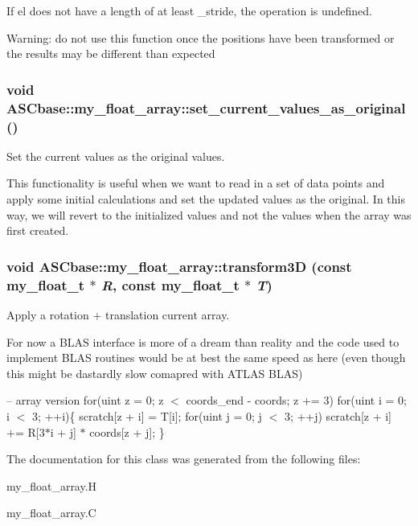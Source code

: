 If el does not have a length of at least \_\-stride, the operation is undefined.

Warning: do not use this function once the positions have been transformed or the results may be different than expected 
\subsubsection{\setlength{\rightskip}{0pt plus 5cm}void ASCbase::my\_\-float\_\-array::set\_\-current\_\-values\_\-as\_\-original ()\hspace{0.3cm}{\tt  [inline]}}\label{classASCbase_1_1my__float__array_a98bd8a8f5970ca4cd7523e15a0af9f8}


Set the current values as the original values. 

This functionality is useful when we want to read in a set of data points and apply some initial calculations and set the updated values as the original. In this way, we will revert to the initialized values and not the values when the array was first created. 
\subsubsection{\setlength{\rightskip}{0pt plus 5cm}void ASCbase::my\_\-float\_\-array::transform3D (const my\_\-float\_\-t $\ast$ {\em R}, const my\_\-float\_\-t $\ast$ {\em T})\hspace{0.3cm}{\tt  [inline]}}\label{classASCbase_1_1my__float__array_6539a83a54fe3c26d54f4bce4bfc7057}


Apply a rotation + translation current array. 

For now a BLAS interface is more of a dream than reality and the code used to implement BLAS routines would be at best the same speed as here (even though this might be dastardly slow comapred with ATLAS BLAS)

-- array version for(uint z = 0; z $<$ coords\_\-end - coords; z += 3) for(uint i = 0; i $<$ 3; ++i)\{ scratch[z + i] = T[i]; for(uint j = 0; j $<$ 3; ++j) scratch[z + i] += R[3$\ast$i + j] $\ast$ coords[z + j]; \} 

The documentation for this class was generated from the following files:\begin{CompactItemize}
\item 
my\_\-float\_\-array.H\item 
my\_\-float\_\-array.C\end{CompactItemize}
